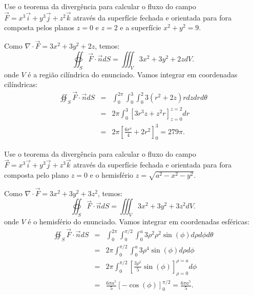 \begin{exeresol} Use o teorema da divergência para calcular o fluxo do campo $\vec{F}=x^3\vec{i}+y^3\vec{j}+z^2\vec{k}$ através da superfície fechada e orientada para fora composta pelos planos $z=0$ e $z=2$ e a superfície $x^2+y^2= 9$.
\end{exeresol}
\begin{resol}
Como $\nabla\cdot \vec{F}=3x^2+3y^2+2z$, temos: 
$$
\oiint_S \vec{F}\cdot \vec{n} dS=\iiint_V 3x^2+3y^2+2z dV.
$$
onde $V$ é a região cilíndrica do enunciado. Vamos integrar em coordenadas cilíndricas:
\begin{eqnarray*}
\oiint_S \vec{F}\cdot \vec{n} dS&=&\int_0^{2\pi} \int_0^3 \int_0^2 3 (r^2+2z )r dzdrd\theta\\
&=&2\pi \int_0^3 \left[ 3 r^3z+z^2r \right]_{z=0}^{z=2}dr\\
&=&2\pi  \left[ \frac{6r^4}{4} +2r^2 \right]_{0}^{3}=279\pi. 
\end{eqnarray*}
\end{resol}

\begin{exeresol} Use o teorema da divergência para calcular o fluxo do campo $\vec{F}=x^3\vec{i}+y^3\vec{j}+z^3\vec{k}$ através da superfície fechada e orientada para fora composta pelo plano $z=0$ e o hemisfério  $z=\sqrt{a^2-x^2-y^2}$.
\end{exeresol}
\begin{resol}
Como $\nabla\cdot \vec{F}=3x^2+3y^2+3z^2$, temos: 
$$
\oiint_S \vec{F}\cdot \vec{n} dS=\iiint_V 3x^2+3y^2+3z^2 dV.
$$
onde $V$ é o hemisfério do enunciado. Vamos integrar em coordenadas esféricas:
\begin{eqnarray*}
\oiint_S \vec{F}\cdot \vec{n} dS&=&\int_0^{2\pi} \int_0^{\pi/2} \int_0^a 3\rho^2 \rho^2\sin(\phi)d\rho d\phi d\theta\\
&=&2\pi \int_0^{\pi/2} \int_0^a 3\rho^4\sin(\phi)d\rho d\phi \\
&=&2\pi \int_0^{\pi/2} \left[ \frac{3\rho^5}{5}\sin(\phi)\right]_{\rho=0}^{\rho=a} d\phi \\
&=&\frac{6\pi a^5}{5} \left[ -\cos(\phi)\right]_0^{\pi/2}=\frac{6\pi a^5}{5}. 
\end{eqnarray*}
\end{resol}


